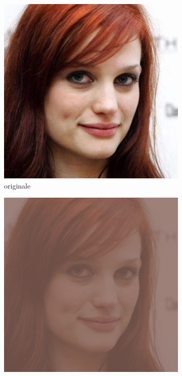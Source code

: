 \begin{figure}[ht]
\begin{subfigure}[t]{0.18\textwidth}
\includegraphics[width=\textwidth]{./Images/preprocessed.jpg}
\caption{originale}
\label{sfig:corruption_contrast}
\end{subfigure}\hfill
\begin{subfigure}[t]{0.18\textwidth}
\includegraphics[width=\textwidth]{./Images/contrast_severity_0.2.jpg}

\end{subfigure}
\end{figure}
